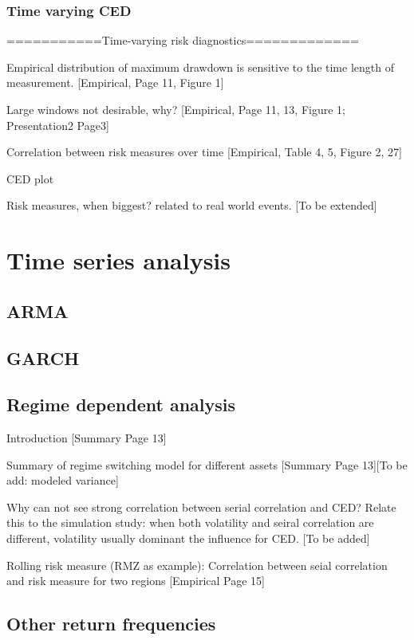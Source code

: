 \documentclass[11pt]{article}
\begin{document}
\subsubsection{Time varying CED}




===========Time-varying risk diagnostics=============

Empirical distribution of maximum drawdown is sensitive to the time length of measurement. [Empirical, Page 11, Figure 1]

Large windows not desirable, why? [Empirical, Page 11, 13, Figure 1; Presentation2 Page3]

Correlation between risk measures over time [Empirical, Table 4, 5, Figure 2, 27]

CED plot

Risk measures, when biggest? related to real world events. [To be extended]

\section{Time series analysis}

\subsection{ARMA}

\subsection{GARCH}

\subsection{Regime dependent analysis}

Introduction [Summary Page 13]

Summary of regime switching model for different assets [Summary Page 13][To be add: modeled variance]

Why can not see strong correlation between serial correlation and CED? Relate this to the simulation study: when both volatility and seiral correlation are different, volatility usually dominant the influence for CED. [To be added]

Rolling risk measure (RMZ as example): Correlation between seial correlation and risk measure for two regions [Empirical Page 15]

\subsection{Other return frequencies}
\end{document}

